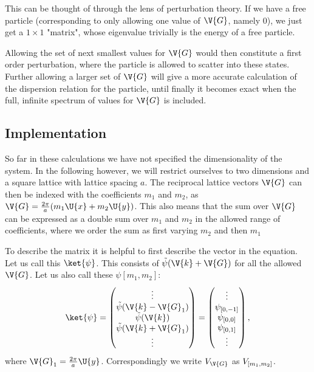 \documentclass[main.tex]{subfiles}
\begin{document}
	This can be thought of through the lens of perturbation theory. If we have a free particle (corresponding to only allowing one value of $ \V{G} $, namely 0), we just get a $ 1\times 1$ "matrix", whose eigenvalue trivially is the energy of a free particle. 
	
	Allowing the set of next smallest values for $ \V{G} $ would then constitute a first order perturbation, where the particle is allowed to scatter into these states. Further allowing a larger set of $ \V{G} $ will give a more accurate calculation of the dispersion relation for the particle, until finally it becomes exact when the full, infinite spectrum of values for $ \V{G} $ is included.
	
	\subsection{Implementation}
	So far in these calculations we have not specified the dimensionality of the system. In the following however, we will restrict ourselves to two dimensions and a square lattice with lattice spacing $ a $. The reciprocal lattice vectors $ \V{G} $ can then be indexed with the coefficients $ m_1 $ and $ m_2 $, as $ \V{G} = \frac{2\pi}{a} (m_1 \U{x} + m_2 \U{y}) $. This also means that the sum over $ \V{G} $ can be expressed as a double sum over $ m_1 $ and $ m_2 $ in the allowed range of coefficients, where we order the sum as first varying $ m_2 $ and then $ m_1 $
	
	To describe the matrix it is helpful to first describe the vector in the equation. Let us call this $ \ket{\psi} $. This consists of $ \tilde{\psi} (\V{k}+\V{G}) $ for all the allowed $ \V{G} $. Let us also call these $ \psi[m_1, m_2] $:
	\begin{equation}\label{key}
		\ket{\psi} = \begin{pmatrix}
		\vdots \\ \tilde{\psi}(\V{k}-\V{G}_1) \\ \tilde{\psi}(\V{k}) \\ \tilde{\psi}(\V{k}+\V{G}_1) \\ \vdots
		\end{pmatrix} = \begin{pmatrix}
		\vdots \\ \psi\coef{0, -1}\\ \psi\coef{0, 0} \\ \psi\coef{0, 1} \\ \vdots
		\end{pmatrix},
	\end{equation}
	where $ \V{G}_1 = \frac{2\pi}{a} \U{y}$. Correspondingly we write $ V_{\V{G}} $ as $ V_{[m_1, m_2]} $.
\end{document}
